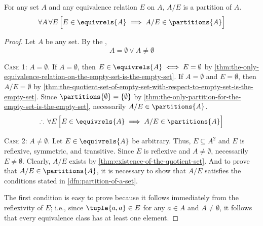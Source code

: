 \begin{lem}
    \label{lem:the-quotient-set-of-a-set-is-a-partition-of-the-set}
    For any set \( A \) and any equivalence relation \( E \) on \( A \),
    \( A / E \) is a partition of \( A \).
    \begin{equation*}
        \forall A \, \forall E \, \Big[ E \in \equivrels{A} \implies A / E \in \partitions{A} \Big]
    \end{equation*}
\end{lem}

\begin{proof}
    Let \( A \) be any set. By the ,
    \begin{equation*}
        A = \emptyset \lor A \neq \emptyset
    \end{equation*}

    \noindent
    {\scshape Case 1}: \( A = \emptyset \). If \( A = \emptyset \), then \( E \in \equivrels{A} \iff E = \emptyset \)
    by \cref{thm:the-only-equivalence-relation-on-the-empty-set-is-the-empty-set}. If \( A = \emptyset \) and \( E = \emptyset \),
    then \( A / E = \emptyset \) by \cref{thm:the-quotient-set-of-empty-set-with-respect-to-empty-set-is-the-empty-set}. Since
    \( \partitions{\emptyset} = \mleft\{ \emptyset \mright\} \) by \cref{thm:the-only-partition-for-the-empty-set-is-the-empty-set},
    necessarily \( A / E \in \partitions{A} \).
    \begin{equation*}
        \therefore \, \forall E \, \Big[ E \in \equivrels{A} \implies A / E \in \partitions{A} \Big]
    \end{equation*}

    \noindent
    {\scshape Case 2}: \( A \neq \emptyset \). Let \( E \in \equivrels{A} \) be arbitrary. Thus, \( E \subseteq A^{2}\) and \( E \)
    is reflexive, symmetric, and transitive. Since \( E \) is reflexive and \( A \neq \emptyset \), necessarily \( E \neq \emptyset \).
    Clearly, \( A / E\) exists by \cref{thm:existence-of-the-quotient-set}.
    And to prove that \( A / E \in \partitions{A} \), it is necessary to show that \( A / E \) satisfies the conditions stated in
    \cref{dfn:partition-of-a-set}.

    \vspace{0.3cm}
    \noindent
    The first condition is easy to prove because it follows immediately from the reflexivity of \( E \); i.e., since \( \tuple{a,a} \in E \)
    for any \( a \in A \) and \( A \neq \emptyset \), it follows that every equivalence class has at least one element.


\end{proof}
